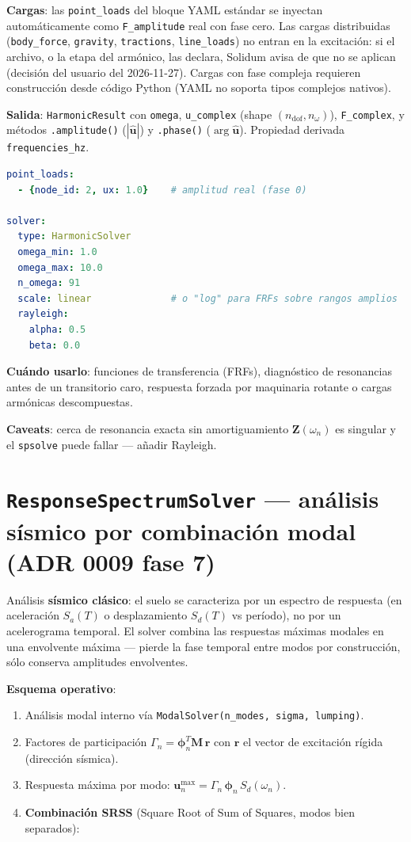 \documentclass[11pt,oneside]{report}
\begin{document}
\textbf{Cargas}: las \texttt{point\_loads} del bloque YAML estándar se inyectan automáticamente como \texttt{F\_amplitude} real con fase cero. Las cargas distribuidas (\texttt{body\_force}, \texttt{gravity}, \texttt{tractions}, \texttt{line\_loads}) no entran en la excitación: si el archivo, o la etapa del armónico, las declara, Solidum avisa de que no se aplican (decisión del usuario del 2026-11-27). Cargas con fase compleja requieren construcción desde código Python (YAML no soporta tipos complejos nativos).

\textbf{Salida}: \texttt{HarmonicResult} con \texttt{omega}, \texttt{u\_complex} (shape $(n_{\text{dof}}, n_\omega)$), \texttt{F\_complex}, y métodos \texttt{.amplitude()} ($|\hat{\mathbf u}|$) y \texttt{.phase()} ($\arg \hat{\mathbf u}$). Propiedad derivada \texttt{frequencies\_hz}.

\begin{lstlisting}[language=yaml]
point_loads:
  - {node_id: 2, ux: 1.0}    # amplitud real (fase 0)

solver:
  type: HarmonicSolver
  omega_min: 1.0
  omega_max: 10.0
  n_omega: 91
  scale: linear              # o "log" para FRFs sobre rangos amplios
  rayleigh:
    alpha: 0.5
    beta: 0.0

\end{lstlisting}

\textbf{Cuándo usarlo}: funciones de transferencia (FRFs), diagnóstico de resonancias antes de un transitorio caro, respuesta forzada por maquinaria rotante o cargas armónicas descompuestas.

\textbf{Caveats}: cerca de resonancia exacta sin amortiguamiento $\mathbf Z(\omega_n)$ es singular y el \texttt{spsolve} puede fallar --- añadir Rayleigh.

\section{\texttt{ResponseSpectrumSolver} --- análisis sísmico por combinación modal (ADR 0009 fase 7)}

Análisis \textbf{sísmico clásico}: el suelo se caracteriza por un espectro de respuesta (en aceleración $S_a(T)$ o desplazamiento $S_d(T)$ vs período), no por un acelerograma temporal. El solver combina las respuestas máximas modales en una envolvente máxima --- pierde la fase temporal entre modos por construcción, sólo conserva amplitudes envolventes.

\textbf{Esquema operativo}:

\begin{enumerate}
  \item Análisis modal interno vía \texttt{ModalSolver(n\_\allowbreak{}modes, sigma, lumping)}.
  \item Factores de participación $\Gamma_n = \boldsymbol\phi_n^T\mathbf M\,\mathbf r$ con $\mathbf r$ el vector de excitación rígida (dirección sísmica).
  \item Respuesta máxima por modo: $\mathbf u_n^{\max} = \Gamma_n\,\boldsymbol\phi_n\,S_d(\omega_n)$.
  \item \textbf{Combinación SRSS} (Square Root of Sum of Squares, modos bien separados):
\end{enumerate}
\end{document}
